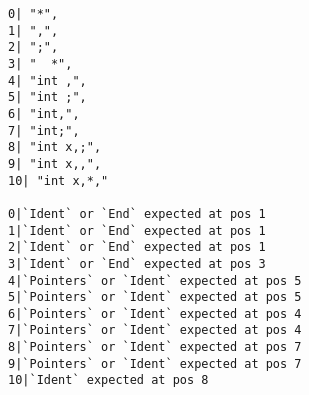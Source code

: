 \begin{lstlisting}
0| "*",
1| ",",
2| ";",
3| "  *",
4| "int ,",
5| "int ;",
6| "int,",
7| "int;",
8| "int x,;",
9| "int x,,",
10| "int x,*,"

0|`Ident` or `End` expected at pos 1
1|`Ident` or `End` expected at pos 1
2|`Ident` or `End` expected at pos 1
3|`Ident` or `End` expected at pos 3
4|`Pointers` or `Ident` expected at pos 5
5|`Pointers` or `Ident` expected at pos 5
6|`Pointers` or `Ident` expected at pos 4
7|`Pointers` or `Ident` expected at pos 4
8|`Pointers` or `Ident` expected at pos 7
9|`Pointers` or `Ident` expected at pos 7
10|`Ident` expected at pos 8
\end{lstlisting}




